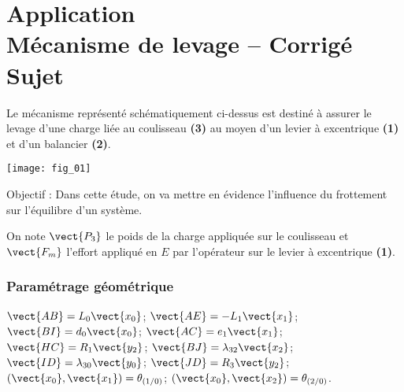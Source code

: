 \chapter*{Application  \\ 
Mécanisme de levage -- \ifprof Corrigé \else Sujet \fi}

\iflivret {} \else
\ifprof  {} \else \fi
\fi

\setcounter{question}{0}


Le mécanisme représenté schématiquement ci-dessus est destiné à assurer le levage d’une charge liée au coulisseau \textbf{(3)} au moyen d’un levier à excentrique \textbf{(1)} et d’un balancier \textbf{(2)}.

\begin{center}
\texttt{[image: fig\_01]}
\end{center}
\begin{obj}
Objectif : Dans cette étude, on va mettre en évidence l’influence du frottement sur l’équilibre d’un système.
\end{obj}

On note  $\vect{P_3}$ le poids de la charge appliquée sur le coulisseau et $\vect{F_m}$ l’effort appliqué en $E$ par l’opérateur sur le levier à excentrique \textbf{(1)}.

\subsection*{Paramétrage géométrique}
$\vect{AB}=L_0\vect{x_0}$; 
$\vect{AE}=-L_1\vect{x_1}$; 
$\vect{BI}=d_0\vect{x_0}$; 
$\vect{AC}=e_1\vect{x_1}$; 
$\vect{HC}=R_1\vect{y_2}$; 
$\vect{BJ}=\lambda_{32}\vect{x_2}$; 
$\vect{ID}=\lambda_{30}\vect{y_0}$; 
$\vect{JD}=R_3\vect{y_2}$; 
$\left(\vect{x_0},\vect{x_1} \right)=\theta_{\left(1/0\right)}$; 
$\left(\vect{x_0},\vect{x_2} \right)=\theta_{\left(2/0\right)}$.
 	 	 	 	 

